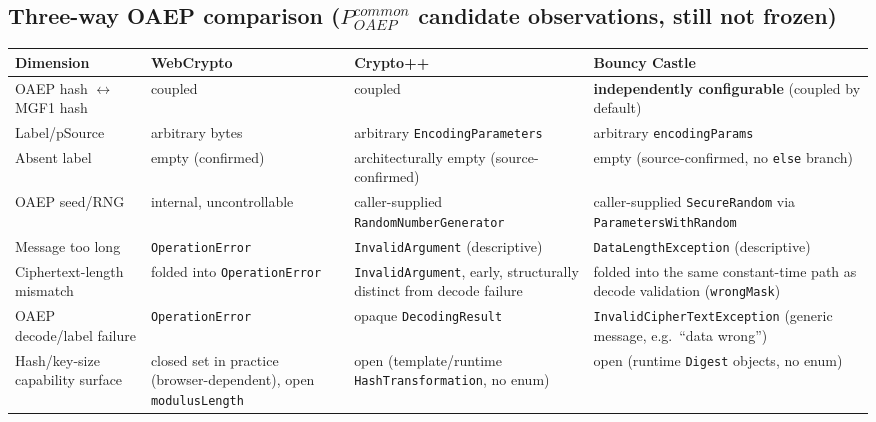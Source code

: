 \documentclass[11pt,a4paper]{article}
\begin{document}
\subsection{Three-way OAEP comparison ($P_{OAEP}^{common}$ candidate observations, still not frozen)}
\begin{center}
\begin{tabularx}{\textwidth}{@{}l>{\raggedright\arraybackslash}X>{\raggedright\arraybackslash}X>{\raggedright\arraybackslash}X@{}}
\toprule
Dimension & WebCrypto & Crypto++ & Bouncy Castle \\
\midrule
OAEP hash $\leftrightarrow$ MGF1 hash & coupled & coupled & \textbf{independently configurable} (coupled by default) \\
Label/pSource & arbitrary bytes & arbitrary \texttt{EncodingParameters} & arbitrary \texttt{encodingParams} \\
Absent label & empty (confirmed) & architecturally empty (source-confirmed) & empty (source-confirmed, no \texttt{else} branch) \\
OAEP seed/RNG & internal, uncontrollable & caller-supplied \texttt{RandomNumberGenerator} & caller-supplied \texttt{SecureRandom} via \texttt{ParametersWithRandom} \\
Message too long & \texttt{OperationError} & \texttt{InvalidArgument} (descriptive) & \texttt{DataLengthException} (descriptive) \\
Ciphertext-length mismatch & folded into \texttt{OperationError} & \texttt{InvalidArgument}, early, structurally distinct from decode failure & folded into the same constant-time path as decode validation (\texttt{wrongMask}) \\
OAEP decode/label failure & \texttt{OperationError} & opaque \texttt{DecodingResult} & \texttt{InvalidCipherTextException} (generic message, e.g.\ ``data wrong'') \\
Hash/key-size capability surface & closed set in practice (browser-dependent), open \texttt{modulusLength} & open (template/runtime \texttt{HashTransformation}, no enum) & open (runtime \texttt{Digest} objects, no enum) \\
\bottomrule
\end{tabularx}
\end{center}
\end{document}
